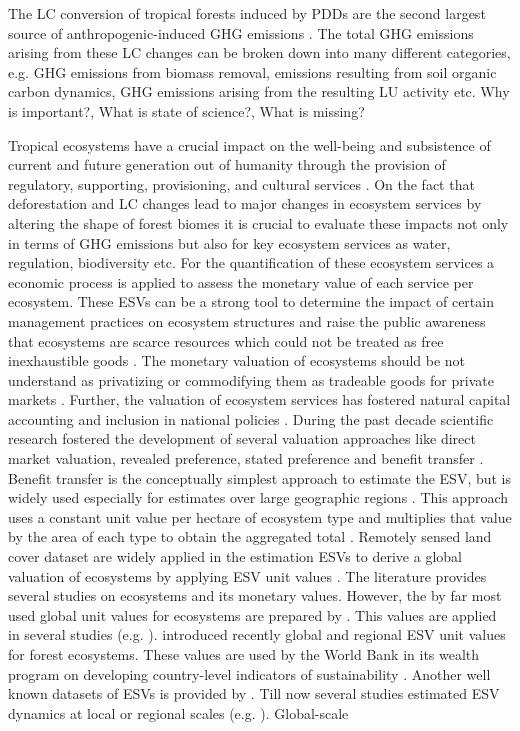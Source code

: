 	The \ac{LC} conversion of tropical forests induced by \acp{PDD} are the second largest source of anthropogenic-induced \ac{GHG} emissions \citep{Don2010}. The total \ac{GHG} emissions arising from these \ac{LC} changes can be broken down into many different categories, e.g. \ac{GHG} emissions from biomass removal, emissions resulting from soil organic carbon dynamics, \ac{GHG} emissions arising from the resulting \ac{LU} activity etc. Why is important?, What is state of science?, What is missing?

	Tropical ecosystems have a crucial impact on the well-being and subsistence of current and future generation out of humanity through the provision of regulatory, supporting, provisioning, and cultural services \citep{Costanza1997}. On the fact that deforestation and \ac{LC} changes lead to major changes in ecosystem services by altering the shape of forest biomes it is crucial to evaluate these impacts not only in terms of \ac{GHG} emissions but also for key ecosystem services as water, regulation, biodiversity etc. For the quantification of these ecosystem services a economic process is applied to assess the monetary value of each service per ecosystem. These \acp{ESV} can be a strong tool to determine the impact of certain management practices on ecosystem structures and raise the public awareness that ecosystems are scarce resources which could not be treated as free inexhaustible goods \citep{Groot2012}. The monetary valuation of ecosystems should be not understand as privatizing or commodifying them as tradeable goods for private markets \citep{Costanza2014,Song2018}. Further, the valuation of ecosystem services has fostered natural capital accounting and inclusion in national policies \citep{Song2018}. During the past decade scientific research fostered the development of several valuation approaches like direct market valuation, revealed preference, stated preference and benefit transfer \citep{Song2018}. Benefit transfer is the conceptually simplest approach to estimate the \ac{ESV}, but is widely used especially for estimates over large geographic regions \citep{Costanza1997,Song2018,Costanza2014}. This approach uses a constant unit value per hectare of ecosystem type and multiplies that value by the area of each type to obtain the aggregated total \citep{Costanza2014}. Remotely sensed land cover dataset are widely applied in the estimation \acp{ESV} to derive a global valuation of ecosystems by applying \ac{ESV} unit values \citep{Song2018}. The literature provides several studies on ecosystems and its monetary values. However, the by far most used global unit values for ecosystems are prepared by \citeauthor{Costanza2014}. This values are applied in several studies (e.g. \citet{Costanza2014,Song2018,Sannigrahi2018,Kreuter2001,Wang2006,Zhao2004}). \citet{Siikamaki2015} introduced recently global and regional \ac{ESV} unit values for forest ecosystems. These values are used by the World Bank in its wealth program on developing country-level indicators of sustainability \citep{Siikamaki2015}. Another well known datasets of \acp{ESV} is provided by \citet{Groot2012}. Till now several studies estimated \ac{ESV} dynamics at local or regional scales (e.g. \citet{Kreuter2001,Wang2006,Zhao2004}). Global-scale 